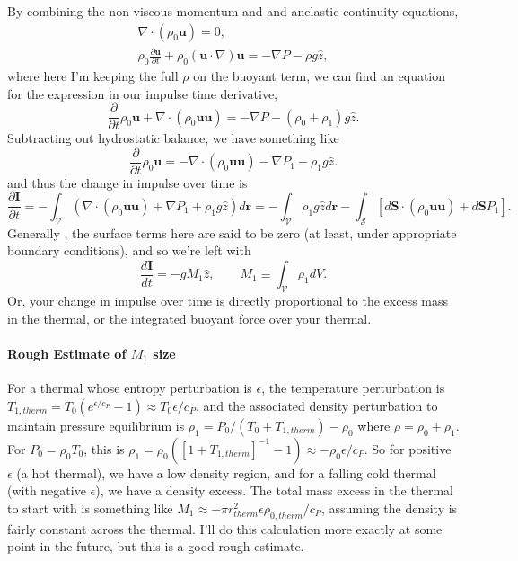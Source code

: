 \documentclass[onecolumn, amsmath, amsfonts, amssymb]{aastex62}
\newcommand{\Div}[1]{\ensuremath{\nabla\cdot\left( #1\right)}}
\newcommand{\grad}{\ensuremath{\nabla}}
\begin{document}
By combining the non-viscous momentum and and anelastic continuity equations,
\begin{equation}
\begin{split}
\Div{\rho_0 \bm{u}} = 0, \\
\rho_0\frac{\partial \bm{u}}{\partial t} + \rho_0(\bm{u}\cdot\grad)\bm{u} =
-\grad P - \rho g \hat{z},
\end{split}
\end{equation}
where here I'm keeping the full $\rho$ on the buoyant term, we can find an 
equation for the expression in our impulse time derivative,
$$
\frac{\partial}{\partial t}{\rho_0 \bm{u}} + \grad\cdot(\rho_0\bm{u}\bm{u}) = -\grad P - (\rho_0 + \rho_1) g \hat{z}.
$$
Subtracting out hydrostatic balance, we have something like
$$
\frac{\partial}{\partial t}{\rho_0 \bm{u}} = - \grad\cdot(\rho_0\bm{u}\bm{u}) - \grad P_1 - \rho_1 g \hat{z}.
$$
and thus the change in impulse over time is
\begin{equation}
\frac{\partial \bm{I}}{\partial t} = 
-\int_{\mathcal{V}}\left(
\grad\cdot(\rho_0\bm{u}\bm{u}) + \grad P_1 + \rho_1 g \hat{z}
\right)d\bm{r}
= -\int_{\mathcal{V}}\rho_1 g\hat{z} d\bm{r} -
\int_{\mathcal{S}} [d\bm{S}\cdot(\rho_0\bm{u}\bm{u}) + d\bm{S}P_1].
\end{equation}
Generally \citep[in][and I think in other thermal work]{shivamoggi2010}, the
surface terms here are said to be zero (at least, under appropriate boundary
conditions), and so we're left with
\begin{equation}
\boxed{
\frac{d\bm{I}}{dt} = -gM_1 \hat{z}, \qquad M_1 \equiv \int_{\mathcal{V}}\rho_1 dV
}.
\label{eqn:dI_dt}
\end{equation}
Or, your change in impulse over time is directly proportional to the excess mass
in the thermal, or the integrated buoyant force over your thermal. 

\paragraph{Rough Estimate of $M_1$ size} 
For a thermal whose entropy perturbation is $\epsilon$, the temperature perturbation
is $T_{1, therm} = T_0(e^{\epsilon/c_P} - 1) \approx T_0\epsilon/c_P$, and the associated
density perturbation to maintain pressure equilibrium is 
$\rho_1 = P_0 / (T_0 + T_{1, therm}) - \rho_0$ where $\rho = \rho_0 + \rho_1$. For
$P_0 = \rho_0T_0$, this is $\rho_1 = \rho_0( [1 + T_{1, therm}]^{-1} - 1) \approx -\rho_0 \epsilon / c_P$.
So for positive $\epsilon$ (a hot thermal), we have a low density region, and for a falling
cold thermal (with negative $\epsilon$), we have a density excess. The total mass excess in the
thermal to start with is something like $M_1 \approx -\pi r_{therm}^2 \epsilon \rho_{0, therm} / c_P$,
assuming the density is fairly constant across the thermal. I'll do this calculation more
exactly at some point in the future, but this is a good rough estimate.
\end{document}
